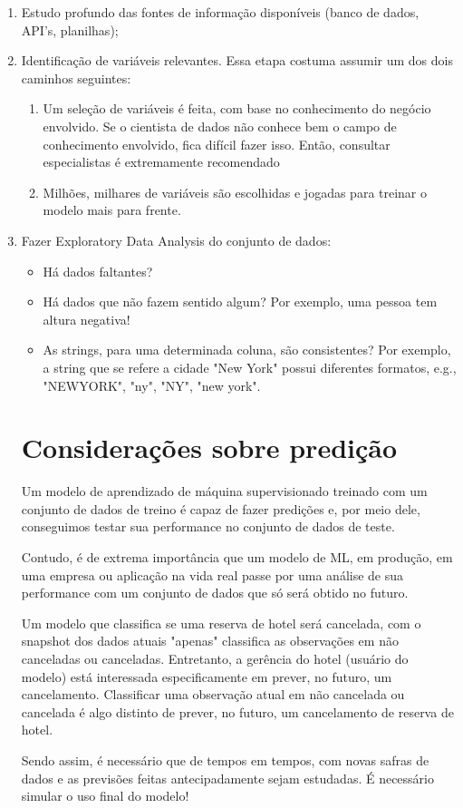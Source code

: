\begin{enumerate}
\item Estudo profundo das fontes de informação disponíveis (banco de dados, API's, planilhas);

\item Identificação de variáveis relevantes. Essa etapa costuma assumir um dos dois caminhos seguintes:
\begin{enumerate}
    \item Um seleção de variáveis é feita, com base no conhecimento do negócio envolvido. Se o cientista de dados não conhece bem o campo de conhecimento envolvido, fica difícil fazer isso. Então, consultar especialistas é extremamente recomendado
    
    \item Milhões, milhares de variáveis são escolhidas e jogadas para treinar o modelo mais para frente.
\end{enumerate}

\item Fazer Exploratory Data Analysis do conjunto de dados:

\begin{itemize}
    \item Há dados faltantes?
    \item Há dados que não fazem sentido algum? Por exemplo, uma pessoa tem altura negativa!
    \item As strings, para uma determinada coluna, são consistentes? Por exemplo, a string que se refere a cidade "New York" possui diferentes formatos, e.g., "NEWYORK", "ny", "NY", "new york".
    
\end{itemize}

\section{Considerações sobre predição}
Um modelo de aprendizado de máquina supervisionado treinado com um conjunto de dados de treino é capaz de fazer predições e, por meio dele, conseguimos testar sua performance no conjunto de dados de teste.

Contudo, é de extrema importância que um modelo de ML, em produção, em uma empresa ou aplicação na vida real passe por uma análise de sua performance com um conjunto de dados que só será obtido no futuro. 

Um modelo que classifica se uma reserva de hotel será cancelada, com o snapshot dos dados atuais "apenas" classifica as observações em não canceladas ou canceladas. Entretanto, a gerência do hotel (usuário do modelo) está interessada especificamente em prever, no futuro, um cancelamento. Classificar uma observação atual em não cancelada ou cancelada é algo distinto de prever, no futuro, um cancelamento de reserva de hotel.

Sendo assim, é necessário que de tempos em tempos, com novas safras de dados e as previsões feitas antecipadamente sejam estudadas. É necessário simular o uso final do modelo! 

\end{enumerate}